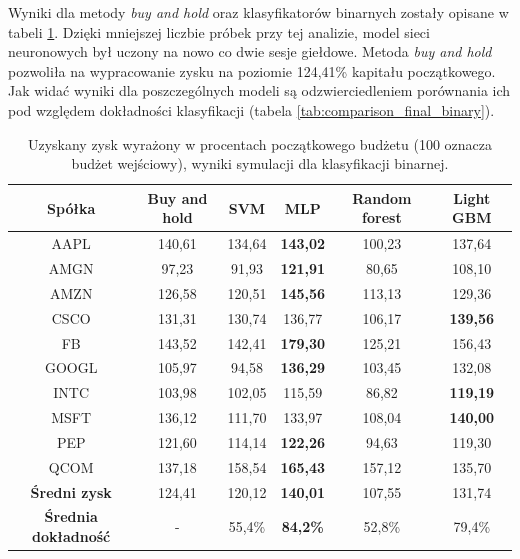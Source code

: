 \documentclass[a4paper, twoside, 11pt, openright]{article}
\begin{document}
\bigskip

Wyniki dla metody \textit{buy and hold} oraz klasyfikatorów binarnych zostały opisane w tabeli \ref{tab:comparison_simulation_binary}. Dzięki mniejszej liczbie próbek przy tej analizie, model sieci neuronowych był uczony na nowo co dwie sesje giełdowe. Metoda \textit{buy and hold} pozwoliła na wypracowanie zysku na poziomie 124,41\% kapitału początkowego. Jak widać wyniki dla poszczególnych modeli są odzwierciedleniem porównania ich pod względem dokładności klasyfikacji (tabela \ref{tab:comparison_final_binary}).

 \begin{table}[H]
    \centering
    \begin{tabular}{|c|c|c|c|c|c|}
    \hline
        \textbf{Spółka}  & \textbf{Buy and hold} & \textbf{SVM} &  \textbf{MLP}  &  \textbf{Random forest}  &  \textbf{Light GBM} \\ \hline
AAPL & 140,61 & 134,64  &  \textbf{143,02} & 100,23 & 137,64\\ \hline
AMGN & 97,23 &  91,93 & \textbf{121,91}  & 80,65 &  108,10 \\ \hline
AMZN & 126,58 &  120,51 & \textbf{145,56} & 113,13 & 129,36 \\ \hline
CSCO & 131,31 & 130,74  & 136,77  & 106,17 &  \textbf{139,56} \\ \hline
FB   & 143,52 & 142,41  & \textbf{179,30} & 125,21 & 156,43 \\ \hline
GOOGL & 105,97 &  94,58 &  \textbf{136,29} & 103,45 & 132,08 \\ \hline
INTC & 103,98 & 102,05  & 115,59  & 86,82 & \textbf{119,19} \\ \hline
MSFT &  136,12 & 111,70  &  133,97  & 108,04 & \textbf{140,00} \\ \hline
PEP  & 121,60 &  114,14 &  \textbf{122,26} & 94,63 & 119,30 \\ \hline
QCOM & 137,18 &  158,54 &  \textbf{165,43} & 157,12 & 135,70  \\ \hline \hline
\textbf{Średni zysk} & 124,41 & 120,12 & \textbf{140,01} &  107,55 & 131,74 \\  \hline 
\textbf{Średnia dokładność} &  - & 55,4\% & \textbf{84,2\%} &  52,8\% & 79,4\% \\  \hline   
    \end{tabular}
    \caption{Uzyskany zysk wyrażony w procentach początkowego budżetu (100 oznacza budżet wejściowy), wyniki symulacji dla klasyfikacji binarnej.}
    \label{tab:comparison_simulation_binary}
\end{table}   
\end{document}
